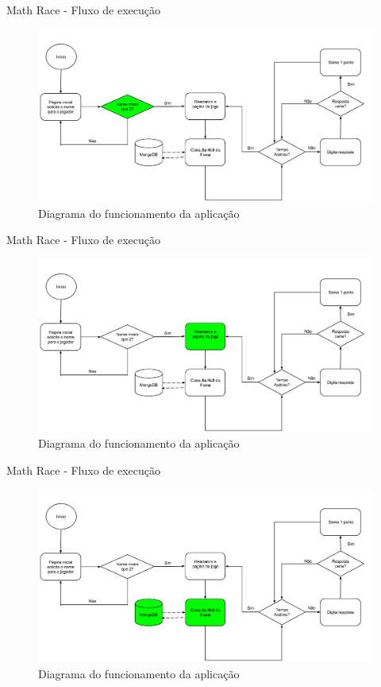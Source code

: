 \documentclass{beamer}
\begin{document}
\begin{frame}{Math Race - Fluxo de execução}
    \begin{figure}[htb]
    \centering
    \includegraphics[scale=0.2]{../images/func_mr_s3.png}
    \caption{Diagrama do funcionamento da aplicação}
    \label{fig: func_mr3}
    \end{figure}
\end{frame}
\begin{frame}{Math Race - Fluxo de execução}
    \begin{figure}[htb]
    \centering
    \includegraphics[scale=0.2]{../images/func_mr_s4.png}
    \caption{Diagrama do funcionamento da aplicação}
    \label{fig: func_mr4}
    \end{figure}
\end{frame}
\begin{frame}{Math Race - Fluxo de execução}
    \begin{figure}[htb]
    \centering
    \includegraphics[scale=0.2]{../images/func_mr_s5.png}
    \caption{Diagrama do funcionamento da aplicação}
    \label{fig: func_mr5}
    \end{figure}
\end{frame}
\end{document}
